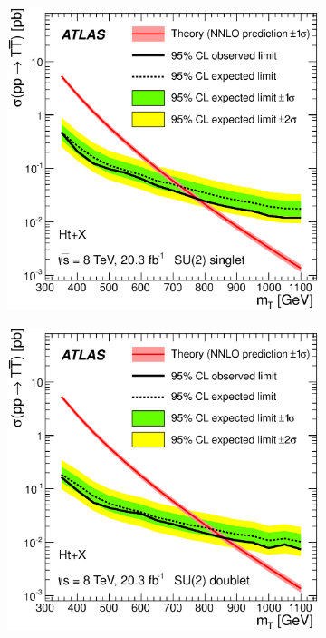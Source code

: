 \begin{figure}[!tp]
\centering
  \begin{subfigure}{0.45\textwidth}
\includegraphics[width=\textwidth]{Analysis/Figures_HtX/HtXPaper/Limits/lim_HtX_singlet.eps}
\caption{}\end{subfigure}
  \begin{subfigure}{0.45\textwidth}
\includegraphics[width=\textwidth]{Analysis/Figures_HtX/HtXPaper/Limits/lim_HtX_doublet.eps}

\end{subfigure}
\end{figure}
